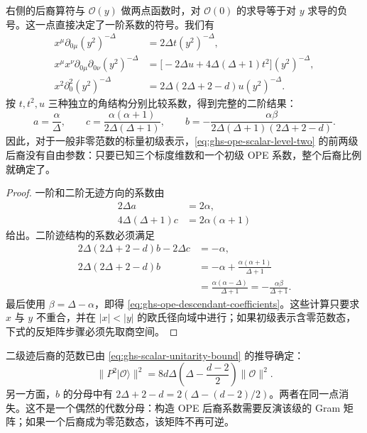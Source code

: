 右侧的后裔算符与 $\mathcal O(y)$ 做两点函数时，对 $\mathcal O(0)$ 的求导等于对 $y$ 求导的负号。这一点直接决定了一阶系数的符号。我们有
\begin{align*}
 x^\mu\partial_{0\mu}(y^2)^{-\Delta}
 &=2\Delta t(y^2)^{-\Delta},\\
 x^\mu x^\nu\partial_{0\mu}\partial_{0\nu}(y^2)^{-\Delta}
 &=\bigl[-2\Delta u+4\Delta(\Delta+1)t^2\bigr](y^2)^{-\Delta},\\
 x^2\partial_0^2(y^2)^{-\Delta}
 &=2\Delta(2\Delta+2-d)u(y^2)^{-\Delta}.
\end{align*}
按 $t,t^2,u$ 三种独立的角结构分别比较系数，得到完整的二阶结果：
\begin{equation}\label{eq:ghs-ope-descendant-coefficients}
 a=\frac{\alpha}{\Delta},\qquad
 c=\frac{\alpha(\alpha+1)}{2\Delta(\Delta+1)},\qquad
 b=-\frac{\alpha\beta}{2\Delta(\Delta+1)(2\Delta+2-d)}.
\end{equation}
因此，对于一般非零范数的标量初级表示，\cref{eq:ghs-ope-scalar-level-two} 的前两级后裔没有自由参数：只要已知三个标度维数和一个初级 OPE 系数，整个后裔比例就确定了。


\begin{proof}
一阶和二阶无迹方向的系数由
\begin{align*}
2\Delta a&=2\alpha,\\
4\Delta(\Delta+1)c&=2\alpha(\alpha+1)
\end{align*}
给出。二阶迹结构的系数必须满足
\begin{align*}
2\Delta(2\Delta+2-d)b-2\Delta c&=-\alpha,\\
2\Delta(2\Delta+2-d)b
&=-\alpha+\frac{\alpha(\alpha+1)}{\Delta+1}\\
&=\frac{\alpha(\alpha-\Delta)}{\Delta+1}
=-\frac{\alpha\beta}{\Delta+1}.
\end{align*}
最后使用 $\beta=\Delta-\alpha$，即得 \cref{eq:ghs-ope-descendant-coefficients}。这些计算只要求 $x$ 与 $y$ 不重合，并在 $|x|<|y|$ 的欧氏径向域中进行；如果初级表示含零范数态，下式的反矩阵步骤必须先取商空间。
\end{proof}

二级迹后裔的范数已由 \cref{eq:ghs-scalar-unitarity-bound} 的推导确定：
\begin{equation}\label{eq:ghs-ope-trace-norm-repeat}
 \|P^2|\mathcal O\rangle\|^2
 =8d\Delta\left(\Delta-\frac{d-2}{2}\right)
 \|\mathcal O\|^2.
\end{equation}
另一方面，$b$ 的分母中有 $2\Delta+2-d=2(\Delta-(d-2)/2)$。两者在同一点消失。这不是一个偶然的代数分母：构造 OPE 后裔系数需要反演该级的 Gram 矩阵；如果一个后裔成为零范数态，该矩阵不再可逆。

